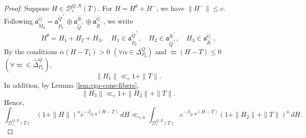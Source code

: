 \documentclass[12pt]{amsart}
\theoremstyle{definition}
\theoremstyle{plain}
\theoremstyle{remark}
\newcommand{\fa}{\mathfrak{a}}
\newcommand{\cD}{\mathcal{D}}
\numberwithin{equation}{section}
\newcommand{\tG}{\widetilde{G}}
\newcommand{\tM}{\widetilde{M}}
\newcommand{\tP}{\widetilde{P}}
\newcommand{\tQ}{\widetilde{Q}}
\newcommand{\tR}{\widetilde{R}}
\begin{document}
\begin{proof}
Suppose $H\in \cD_c^{Q,R}(T)$. 
For $H=H^\theta+ H^-$, we have $\|H^-\|\le c$.  
Following $\fa_{\tM_0}^{\tG}=\fa_{\tP_0}^{\tQ^+}\oplus\fa_{\tQ^+}^{\tR^-}\oplus\fa_{\tR^-}^{\tG}$, we write 
\[
H^{\theta}=H_1+H_2+H_3, \quad H_1\in \fa_{\tP_0}^{\tQ^+}, \quad H_2\in\fa_{\tQ^+}^{\tR^-}, \quad H_3\in\fa_{\tR^-}^{\tG}.
\]
By the conditions $\alpha(H-T_1)>0$ $(\forall\alpha\in \Delta_{P_0}^Q)$ and $\varpi(H-T)\leq0$ $(\forall\varpi\in\widehat\Delta_{P_0}^Q)$, 
\[
\|H_1\| \ll_c 1+\|T\|.
\]
In addition, by Lemma \ref{lem:cga-cone-fibers}, 
\[
\|H_3\|\ll_c  1+\|H_2\|+\|T\|.
\]
Hence, 
\begin{equation}    \label{eq:1019e1}
 \int_{\cD_c^{Q,R}(T)}
       (1+\|H\|)^\kappa e^{-\beta_{Q,R}(H-T)}\,dH  \ll_{c,\kappa} \int_{\cD_c^{Q,R}(T)} e^{-\beta_{Q,R}(H-T)}
       (1+\|H_2\|+\|T\|)^{\kappa} \, dH.    
\end{equation}



\end{proof}
\end{document}
